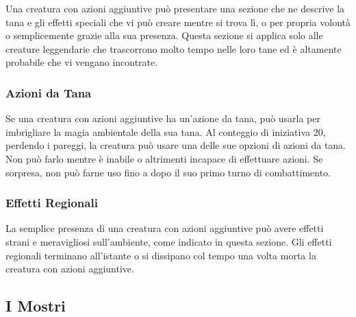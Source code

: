 Una creatura con azioni aggiuntive può presentare una sezione che ne descrive la tana e gli effetti speciali che vi può  creare mentre si trova lì, o per propria volontà o  semplicemente grazie alla sua presenza. Questa  sezione si applica solo alle creature leggendarie che  trascorrono molto tempo nelle loro tane ed è altamente  probabile che vi vengano incontrate.

\subsubsection{Azioni da Tana}

Se una creatura con azioni aggiuntive ha un'azione da tana, può  usarla per imbrigliare la magia ambientale della sua  tana. Al conteggio di iniziativa 20, perdendo i pareggi,  la creatura può usare una delle sue opzioni di azioni da  tana. Non può farlo mentre è inabile o altrimenti  incapace di effettuare azioni. Se sorpresa, non può  farne uso fino a dopo il suo primo turno di combattimento.

\subsubsection{Effetti Regionali}

La semplice presenza di una creatura con azioni aggiuntive può  avere effetti strani e meravigliosi sull'ambiente, come  indicato in questa sezione. Gli effetti regionali terminano all'istante o si dissipano col tempo una volta  morta la creatura con azioni aggiuntive.

\pagebreak
\subsection{I Mostri}

\bigskip

